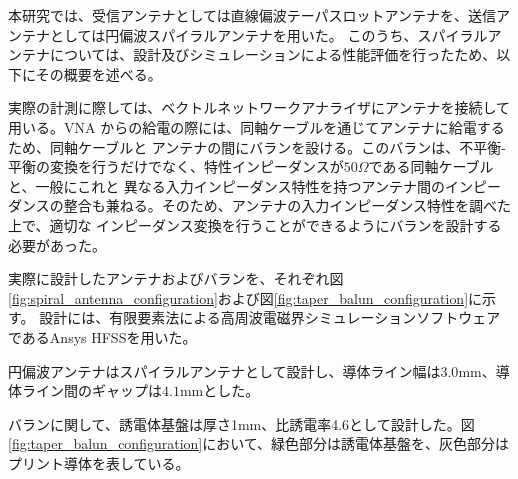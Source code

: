 \documentclass[11pt,a4paper,uplatex]{ujarticle}
\begin{document}
  本研究では、受信アンテナとしては直線偏波テーパスロットアンテナを、送信アンテナとしては円偏波スパイラルアンテナを用いた。
  このうち、スパイラルアンテナについては、設計及びシミュレーションによる性能評価を行ったため、以下にその概要を述べる。

  実際の計測に際しては、ベクトルネットワークアナライザにアンテナを接続して用いる。VNA からの給電の際には、同軸ケーブルを通じてアンテナに給電するため、同軸ケーブルと
  アンテナの間にバランを設ける。このバランは、不平衡-平衡の変換を行うだけでなく、特性インピーダンスが$50\Omega$である同軸ケーブルと、一般にこれと
  異なる入力インピーダンス特性を持つアンテナ間のインピーダンスの整合も兼ねる。そのため、アンテナの入力インピーダンス特性を調べた上で、適切な
  インピーダンス変換を行うことができるようにバランを設計する必要があった。

  実際に設計したアンテナおよびバランを、それぞれ図\ref{fig:spiral_antenna_configuration}および図\ref{fig:taper_balun_configuration}に示す。
  設計には、有限要素法による高周波電磁界シミュレーションソフトウェアであるAnsys HFSSを用いた。

  円偏波アンテナはスパイラルアンテナとして設計し、導体ライン幅は$3.0\mathrm{mm}$、導体ライン間のギャップは$4.1\mathrm{mm}$とした。
  
  バランに関して、誘電体基盤は厚さ1mm、比誘電率4.6として設計した。図\ref{fig:taper_balun_configuration}において、緑色部分は誘電体基盤を、灰色部分は
  プリント導体を表している。

\end{document}

